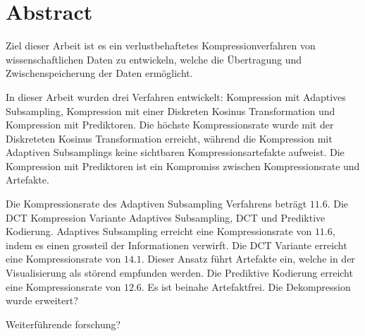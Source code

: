 \section*{Abstract}
Ziel dieser Arbeit ist es ein verlustbehaftetes Kompressionverfahren von wissenschaftlichen Daten zu entwickeln, welche die Übertragung und Zwischenspeicherung der Daten ermöglicht.

In dieser Arbeit wurden drei Verfahren entwickelt: Kompression mit Adaptives Subsampling, Kompression mit einer Diskreten Kosinus Transformation und Kompression mit Prediktoren. Die höchste Kompressionsrate wurde mit der Diskreteten Kosinus Transformation erreicht, während die Kompression mit Adaptiven Subsamplings keine sichtbaren Kompressionsartefakte aufweist. Die Kompression mit Prediktoren ist ein Kompromiss zwischen Kompressionsrate und Artefakte.


Die Kompressionsrate des Adaptiven Subsampling Verfahrens beträgt $11.6$. Die DCT Kompression 
Variante Adaptives Subsampling, DCT und Prediktive Kodierung.
Adaptives Subsampling erreicht eine Kompressionsrate von $11.6$, indem es einen grossteil der Informationen verwirft.
Die DCT Variante erreicht eine Kompressionsrate von $14.1$. Dieser Ansatz führt Artefakte ein, welche in der Visualisierung als störend empfunden werden.
Die Prediktive Kodierung erreicht eine Kompressionsrate von $12.6$. Es ist beinahe Artefaktfrei.
Die Dekompression wurde erweitert?

Weiterführende forschung?